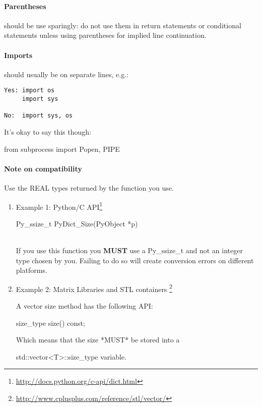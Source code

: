 \paragraph{Parentheses} should be use sparingly: do not use them in return statements or conditional statements unless using parentheses for implied line continuation. %

\paragraph{Imports} should usually be on separate lines, e.g.:
\begin{verbatim}
Yes: import os
     import sys

No:  import sys, os
\end{verbatim}

It's okay to say this though:\\
\begin{tt}
from subprocess import Popen, PIPE
\end{tt}

\paragraph{Note on compatibility}
Use the REAL types returned by the function you use.
\begin{enumerate}
\item Example 1: Python/C API\footnote{\url{http://docs.python.org/c-api/dict.html}}\\
\begin{tt}Py\_ssize\_t PyDict\_Size(PyObject *p)\end{tt}\\
If you use this function you \textbf{MUST} use a Py\_ssize\_t and not an
integer type chosen by you.
Failing to do so will create conversion errors on different platforms.

\item Example 2: Matrix Libraries and STL containers
\footnote{\url{http://www.cplusplus.com/reference/stl/vector/}}

A vector size method has the following API:
\begin{tt}size\_type size() const;\end{tt}

Which means that the size *MUST* be stored into a
\begin{tt}std::vector<T>::size\_type variable.\end{tt}
\end{enumerate}



